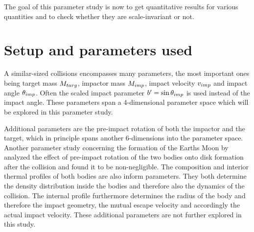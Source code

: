 The goal of this parameter study is now to get quantitative results for various quantities and to check whether they are scale-invariant or not.


\section{Setup and parameters used}
A similar-sized collisions encompasses many parameters, the most important ones being target mass $M_{targ}$, impactor mass $M_{imp}$, impact velocity $v_{imp}$ and impact angle $\theta_{imp}$. Often the scaled impact parameter $b'=\sin{\theta_{imp}}$ is used instead of the impact angle. These parameters span a 4-dimensional parameter space which will be explored in this parameter study. 

Additional parameters are the pre-impact rotation of both the impactor and the target, which in principle spans another 6-dimensions into the parameter space. Another parameter study concerning the formation of the Earths Moon by \cite{Canup:2008p3551} analyzed the effect of pre-impact rotation of the two bodies onto disk formation after the collision and found it to be non-negligible. The composition and interior thermal profiles of both bodies are also inform parameters. They both determine the density distribution inside the bodies and therefore also the dynamics of the collision. The internal profile furthermore determines the radius of the body and therefore the impact geometry, the mutual escape velocity and accordingly the actual impact velocity. These additional parameters are not further explored in this study.

